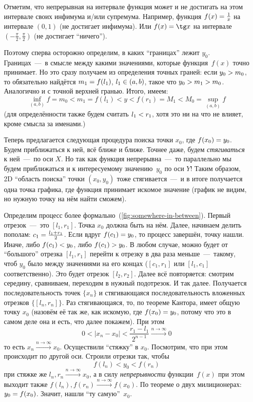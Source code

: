 \documentclass[a4paper,12pt]{article}
\begin{document}
  \begin{solution}
    Отметим, что непрерывная на интервале функция может и не достигать на этом интервале своих инфимума и/или супремума.
    Например, функция $f(x) \hm= \frac{1}{x}$ на интервале $(0, 1)$ (не достигает инфимума).
    Или $f(x) \hm= \tg x$ на интервале $\left(-\frac{\pi}{2}, \frac{\pi}{2}\right)$ (не достигает ``ничего'').

    Поэтому сперва осторожно определим, в каких ``границах'' лежит $y_0$.
    Границах~---~в смысле между какими значениями, которые функция~$f(x)$ точно принимает.
    Но это сразу получаем из определения точных граней: если $y_0 \hm> m_0$, то обязательно найдётся $m_1 \hm= f(l_1)$, $l_1 \hm\in (a, b)$, такое что $y_0 \hm> m_1 \hm> m_0$.
    Аналогично и с точной верхней гранью.
    Итого, имеем:
    \[
      \inf_{(a, b)} f = m_0 < m_1 = f(l_1) < y < f(r_1) = M_1 < M_0 = \sup_{(a, b)} f
    \]
    (для определённости также будем считать $l_1 \hm< r_1$, хотя это ни на что не влияет, кроме смысла за именами.)

    Теперь предлагается следующая процедура поиска точки $x_0$, где $f(x_0) \hm= y_0$.
    Будем приближаться к ней, всё ближе и ближе.
    Точнее даже, будем \emph{стягиваться} к ней~---~по оси $X$.
    Но так как функция непрерывна~---~то параллельно мы будем приближаться и к интересуемому значению~$y_0$ по оси $Y$!
    Таким образом, 2D ``область поиска'' точки $(x_0, y_0)$ тоже стягивается~---~и в итоге получается одна точка графика, где функция принимает искомое значение (график не видим, но нужную точку на нём найти сможем).

    Определим процесс более формально~(\ref{fig:somewhere-in-between}).
    Первый отрезок~---~это $[l_1, r_1]$.
    Точка $x_0$ должна быть на нём.
    Далее, начинаем делить пополам: $c_1 \hm= \frac{l_1 + r_1}{2}$.
    Если вдруг $f(c_1) \hm= y_0$, то процесс завершён, точку нашли.
    Иначе, либо $f(c_1) \hm< y_0$, либо $f(c_1) \hm> y_0$.
    В любом случае, можно будет от ``большого'' отрезка $[l_1, r_1]$ перейти к отрезку в два раза меньше~---~такому, чтоб $y_0$ было между значениями на его концах ($[c_1, r_1]$ или $[l_1, c_1]$ соответственно).
    Это будет отрезок $[l_2, r_2]$.
    Далее всё повторяется: смотрим середину, сравниваем, переходим в нужный подотрезок.
    И так далее.
    Получается последовательность точек $\{x_n\}$ и стягивающаяся последовательность вложенных отрезков $\{[l_n, r_n]\}$.
    Раз стягивающаяся, то, по теореме Кантора, имеет общую точку $x_0$ (назовём её так же, как искомую, где $f(x_0) \hm= y_0$, потому что это в самом деле она и есть, что далее покажем).
    При этом
    \[
      0 < |x_n - x_0| < \frac{r_1 - l_1}{2^{n - 1}} \xrightarrow{n \to \infty} 0
    \]
    то есть $x_n \xrightarrow{n \to \infty} x_0$.
    Осуществили ``стяжку'' в $x_0$.
    Посмотрим, что при этом происходит по другой оси.
    Строили отрезки так, чтобы
    \[
      f(l_n) < y_0 < f(r_n)
    \]
    при стяжке же $l_n, r_n \xrightarrow{n \to \infty} x_0$, а в силу \emph{непрерывности} функции~$f(x)$ при этом выходит также $f(l_n), f(r_n) \xrightarrow{n \to \infty} f(x_0)$.
    По теореме о двух милиционерах: $y_0 \hm= f(x_0)$.
    Значит, нашли ``ту самую''~$x_0$.
    

\end{solution}
\end{document}
